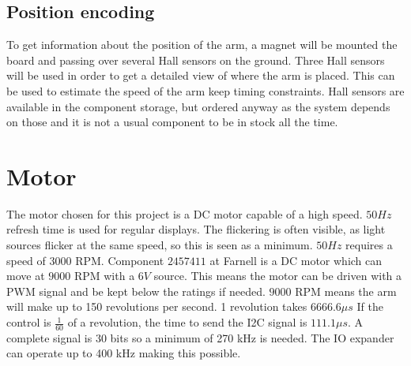\documentclass[a4paper,12pt,journal]{IEEEtran}
\begin{document}
\subsection{Position encoding}
To get information about the position of the arm, a magnet will be mounted the board and passing over several Hall sensors on the ground.
Three Hall sensors will be used in order to get a detailed view of where the arm is placed.
This can be used to estimate the speed of the arm keep timing constraints.
Hall sensors are available in the component storage, but ordered anyway as the system depends on those and it is not a usual component to be in stock all the time.

\section{Motor}
The motor chosen for this project is a DC motor capable of a high speed.
$50Hz$ refresh time is used for regular displays. 
The flickering is often visible, as light sources flicker at the same speed, so this is seen as a minimum.
$50Hz$ requires a speed of $3000$ RPM.
Component $2457411$ at Farnell is a DC motor which can move at $9000$ RPM with a $6V$ source.
This means the motor can be driven with a PWM signal and be kept below the ratings if needed.
$9000$ RPM means the arm will make up to 150 revolutions per second.
1 revolution takes $6666.6 \mu s$
If the control is $\frac{1}{60}$ of a revolution, the time to send the I2C signal is $111.1 \mu s$.
A complete signal is $30$ bits so a minimum of 270 kHz is needed.
The IO expander can operate up to 400 kHz making this possible.
\end{document}
